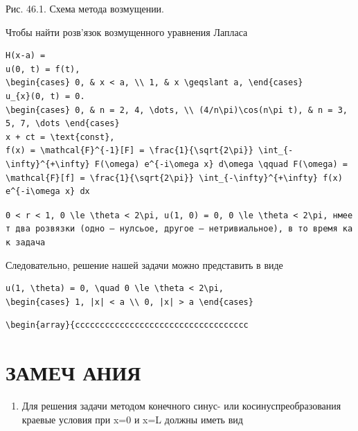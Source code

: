 \documentclass[
  ukrainian,
]{article}
\providecommand{\tightlist}{%
  \setlength{\itemsep}{0pt}\setlength{\parskip}{0pt}}
\begin{document}
Рис. 46.1. Схема метода возмущении.

Чтобы найти розв'язок возмущенного уравнения Лапласа

\begin{verbatim}
H(x-a) =
u(0, t) = f(t),
\begin{cases} 0, & x < a, \\ 1, & x \geqslant a, \end{cases}
u_{x}(0, t) = 0.
\begin{cases} 0, & n = 2, 4, \dots, \\ (4/n\pi)\cos(n\pi t), & n = 3, 5, 7, \dots \end{cases}
x + ct = \text{const},
f(x) = \mathcal{F}^{-1}[F] = \frac{1}{\sqrt{2\pi}} \int_{-\infty}^{+\infty} F(\omega) e^{-i\omega x} d\omega \qquad F(\omega) = \mathcal{F}[f] = \frac{1}{\sqrt{2\pi}} \int_{-\infty}^{+\infty} f(x) e^{-i\omega x} dx
\end{verbatim}

\texttt{\textquotesingle{}0\ \textless{}\ r\ \textless{}\ 1,\textquotesingle{}\ \textquotesingle{}0\ \textbackslash{}le\ \textbackslash{}theta\ \textless{}\ 2\textbackslash{}pi,\textquotesingle{}\ \textquotesingle{}u(1,\ 0)\ =\ 0,\textquotesingle{}\ \textquotesingle{}0\ \textbackslash{}le\ \textbackslash{}theta\ \textless{}\ 2\textbackslash{}pi,\textquotesingle{}\ нмеет\ два\ розв\textquotesingle{}язки\ (одно\ —\ нулсьое,\ другое\ —\ нетривиальное),\ в\ то\ время\ как\ задача}

Следовательно, решение нашей задачи можно представить в виде

\begin{verbatim}
u(1, \theta) = 0, \quad 0 \le \theta < 2\pi,
\begin{cases} 1, |x| < a \\ 0, |x| > a \end{cases}
\end{verbatim}

\begin{verbatim}
\begin{array}{ccccccccccccccccccccccccccccccccccc
\end{verbatim}

\section{ЗАМЕЧ
АНИЯ}\label{ux437ux430ux43cux435ux447-ux430ux43dux438ux44f}

\begin{enumerate}
\def\labelenumi{\arabic{enumi}.}
\tightlist
\item
  Для решения задачи методом конечного синус- или косинуспреобразования
  краевые условия при x=0 и x=L должны иметь вид
\end{enumerate}
\end{document}
